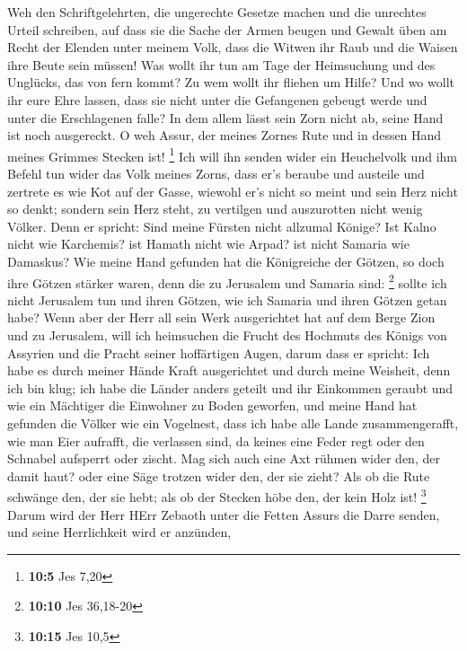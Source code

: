  Weh den Schriftgelehrten, die ungerechte Gesetze machen
und die unrechtes Urteil schreiben,  auf dass sie die
Sache der Armen beugen und Gewalt üben am Recht der Elenden unter meinem
Volk, dass die Witwen ihr Raub und die Waisen ihre Beute sein müssen!
 Was wollt ihr tun am Tage der Heimsuchung und des
Unglücks, das von fern kommt? Zu wem wollt ihr fliehen um Hilfe? Und wo
wollt ihr eure Ehre lassen,  dass sie nicht unter die
Gefangenen gebeugt werde und unter die Erschlagenen falle? In dem allem
lässt sein Zorn nicht ab, seine Hand ist noch ausgereckt. 
O weh Assur, der meines Zornes Rute und in dessen Hand meines Grimmes
Stecken ist! \footnote{\textbf{10:5} Jes 7,20}  Ich will
ihn senden wider ein Heuchelvolk und ihm Befehl tun wider das Volk
meines Zorns, dass er's beraube und austeile und zertrete es wie Kot auf
der Gasse,  wiewohl er's nicht so meint und sein Herz
nicht so denkt; sondern sein Herz steht, zu vertilgen und auszurotten
nicht wenig Völker.  Denn er spricht: Sind meine Fürsten
nicht allzumal Könige?  Ist Kalno nicht wie Karchemis? ist
Hamath nicht wie Arpad? ist nicht Samaria wie Damaskus? 
Wie meine Hand gefunden hat die Königreiche der Götzen, so doch ihre
Götzen stärker waren, denn die zu Jerusalem und Samaria sind:
\footnote{\textbf{10:10} Jes 36,18-20}  sollte ich nicht
Jerusalem tun und ihren Götzen, wie ich Samaria und ihren Götzen getan
habe?  Wenn aber der Herr all sein Werk ausgerichtet hat
auf dem Berge Zion und zu Jerusalem, will ich heimsuchen die Frucht des
Hochmuts des Königs von Assyrien und die Pracht seiner hoffärtigen
Augen,  darum dass er spricht: Ich habe es durch meiner
Hände Kraft ausgerichtet und durch meine Weisheit, denn ich bin klug;
ich habe die Länder anders geteilt und ihr Einkommen geraubt und wie ein
Mächtiger die Einwohner zu Boden geworfen,  und meine
Hand hat gefunden die Völker wie ein Vogelnest, dass ich habe alle Lande
zusammengerafft, wie man Eier aufrafft, die verlassen sind, da keines
eine Feder regt oder den Schnabel aufsperrt oder zischt. 
Mag sich auch eine Axt rühmen wider den, der damit haut? oder eine Säge
trotzen wider den, der sie zieht? Als ob die Rute schwänge den, der sie
hebt; als ob der Stecken höbe den, der kein Holz ist! \footnote{\textbf{10:15}
  Jes 10,5}  Darum wird der Herr HErr Zebaoth unter die
Fetten Assurs die Darre senden, und seine Herrlichkeit wird er anzünden,
